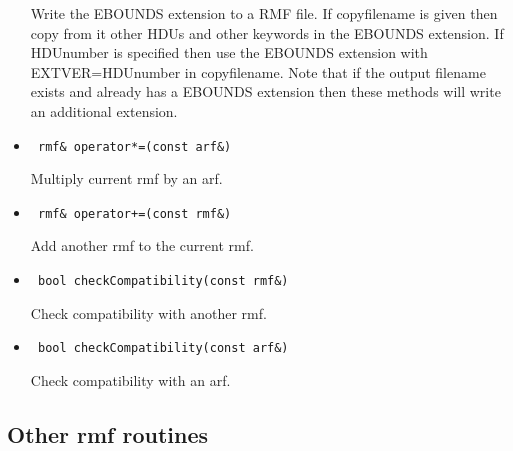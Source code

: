 \documentclass[11pt]{book}
\begin{document}
\begin{itemize}
          Write the EBOUNDS extension to a RMF file. If copyfilename is 
          given then copy from it other HDUs and other keywords in the 
          EBOUNDS extension. If HDUnumber is specified then use the
          EBOUNDS extension with EXTVER=HDUnumber in copyfilename. Note 
          that if the output filename exists and already has a EBOUNDS 
          extension then these methods will write an additional extension.

\item  \begin{verbatim} rmf& operator*=(const arf&) \end{verbatim}

          Multiply current rmf by an arf.

\item  \begin{verbatim} rmf& operator+=(const rmf&) \end{verbatim}

          Add another rmf to the current rmf.

\item  \begin{verbatim} bool checkCompatibility(const rmf&) \end{verbatim}

          Check compatibility with another rmf.

\item  \begin{verbatim} bool checkCompatibility(const arf&) \end{verbatim}

          Check compatibility with an arf.

\end{itemize}

\subsection{Other rmf routines}
\end{document}
